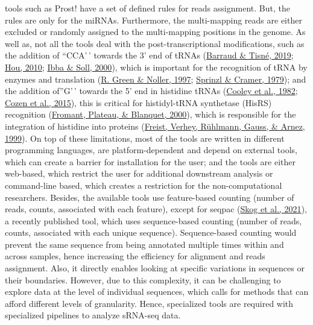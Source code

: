 \documentclass[12pt,twoside]{reedthesis}
\begin{document}
tools such as Prost! have a set of defined rules for reads assignment.
But, the rules are only for the miRNAs. Furthermore, the multi-mapping
reads are either excluded or randomly assigned to the multi-mapping
positions in the genome. As well as, not all the tools deal with the
post-transcriptional modifications, such as the addition of ``CCA'\,'
towards the 3' end of tRNAs (\protect\hyperlink{ref-barraud2019}{Barraud \& Tisné, 2019}; \protect\hyperlink{ref-hou2010}{Hou, 2010}; \protect\hyperlink{ref-ibba2000}{Ibba \& Soll, 2000}), which
is important for the recognition of tRNA by enzymes and translation
(\protect\hyperlink{ref-green1997}{R. Green \& Noller, 1997}; \protect\hyperlink{ref-sprinzl1979}{Sprinzl \& Cramer, 1979}); and the addition of''G'\,' towards the 5' end
in histidine tRNAs (\protect\hyperlink{ref-cooley1982}{Cooley et al., 1982}; \protect\hyperlink{ref-cozen2015}{Cozen et al., 2015}), this is critical for
histidyl-tRNA synthetase (HisRS) recognition (\protect\hyperlink{ref-fromant2000}{Fromant, Plateau, \& Blanquet, 2000}), which is
responsible for the integration of histidine into proteins
(\protect\hyperlink{ref-freist1999}{Freist, Verhey, Rühlmann, Gauss, \& Arnez, 1999}). On top of these limitations, most of the tools are
written in different programming languages, are platform-dependent and
depend on external tools, which can create a barrier for installation
for the user; and the tools are either web-based, which restrict the
user for additional downstream analysis or command-line based, which
creates a restriction for the non-computational researchers. Besides,
the available tools use feature-based counting (number of reads, counts,
associated with each feature), except for seqpac (\protect\hyperlink{ref-skog2021}{Skog et al., 2021}), a recently
published tool, which uses sequence-based counting (number of reads,
counts, associated with each unique sequence). Sequence-based counting
would prevent the same sequence from being annotated multiple times
within and across samples, hence increasing the efficiency for alignment
and reads assignment. Also, it directly enables looking at specific
variations in sequences or their boundaries. However, due to this
complexity, it can be challenging to explore data at the level of
individual sequences, which calls for methods that can afford different
levels of granularity. Hence, specialized tools are required with
specialized pipelines to analyze sRNA-seq data.
\end{document}
